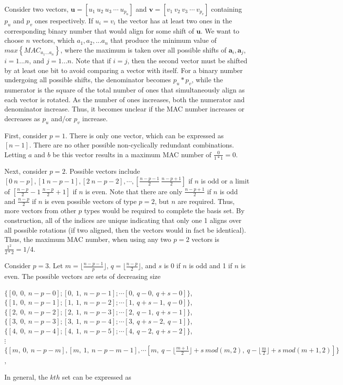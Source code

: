 \documentclass[3p,times]{elsarticle}
\begin{document}
Consider two vectors, $\textbf{u}=\left[u_1\ u_2\ u_3\ \cdots\ u_{p_u}\right]$ and $\textbf{v}=\left[v_1\ v_2\ v_3\ \cdots\ v_{p_v}\right]$ containing $p_u$ and $p_v$ ones respectively.  If $u_i=v_i$ the vector has at least two ones in the corresponding binary number that would align for some shift of $\textbf{u}$.  
We want to choose $n$ vectors, which $a_1, a_2, ... a_n$ that produce the minimum value of $max\left\{MAC_{a_1...a_n}\right\}$, where the maximum is taken over all possible shifts of $\textbf{a}_i, \textbf{a}_j$, $i=1...n$, and $j=1...n$.  Note that if $i=j$, then the second vector must be shifted by at least one bit to avoid comparing a vector with itself.  For a binary number undergoing all possible shifts, the denominator becomes $p_u * p_v$, while the 
numerator is the square of the total number of ones that simultaneously align as each vector is rotated.  As the number of ones increases, both the numerator and denominator increase.   
Thus, it becomes unclear if the MAC number increases or decreases as $p_u$ and/or $p_v$ increase.

First, consider $p=1$.  There is only one vector, which can be expressed as $\left[n-1\right]$.  There are no other possible non-cyclically redundant combinations.  Letting $a$ and $b$ be this vector results in a maximum MAC number of $\frac{0}{1*1}=0$.

Next, consider $p=2$.  Possible vectors include $[0\ n-p], [1\  n-p-1], [2\ n-p-2], \cdots, [\frac{n-p-1}{2}\ \frac{n-p+1}{2}]$ if $n$ is odd or a limit of $[\frac{n-p}{2}-1\ \frac{n-p}{2}+1]$ if $n$ is even.  Note that there are 
only $\frac{n-p+1}{2}$ if $n$ is odd and $\frac{n-p}{2}$ if $n$ is even possible vectors of type $p=2$, but $n$ are required.  Thus, more vectors from other $p$ types would be required to complete the basis set.  
By construction, all of the indices are unique indicating that only one 1 aligns over all possible rotations (if two aligned, then the vectors would in fact be identical).  Thus, 
the maximum MAC number, when using any two $p=2$ vectors is $\frac{1^2}{2*2}=1/4$.

Consider $p=3$.  Let $m=\lfloor\frac{n-p-1}{p}\rfloor$, $q=\lfloor\frac{n-p}{2}\rfloor$, and $s$ is 0 if $n$ is odd and 1 if $n$ is even. The possible vectors are sets of decreasing size

\begin{center}
$\{[0,\ 0,\ n-p-0]; [0,\ 1,\ n-p-1]; \cdots [0,\ q-0,\ q+s-0]\}$,\\
$\{[1,\ 0,\ n-p-1]; [1,\ 1,\ n-p-2]; \cdots [1,\ q+s-1,\ q-0]\}$,\\
$\{[2,\ 0,\ n-p-2]; [2,\ 1,\ n-p-3]; \cdots [2,\ q-1,\ q+s-1]\}$,\\
$\{[3,\ 0,\ n-p-3]; [3,\ 1,\ n-p-4]; \cdots [3,\ q+s-2,\ q-1]\}$,\\
$\{[4,\ 0,\ n-p-4]; [4,\ 1,\ n-p-5]; \cdots [4,\ q-2,\ q+s-2]\}$,\\
$\vdots$ \\
$\{[m,\ 0,\ n-p-m], [m,\ 1,\ n-p-m-1], \cdots [m,\ q-\lfloor \frac{m+1}{2}\rfloor+s\ mod(m,2),\ q-\lfloor \frac{m}{2}\rfloor+s\ mod(m+1,2)]\}$,
\end{center}
In general, the $kth$ set can be expressed as 
\end{document}
